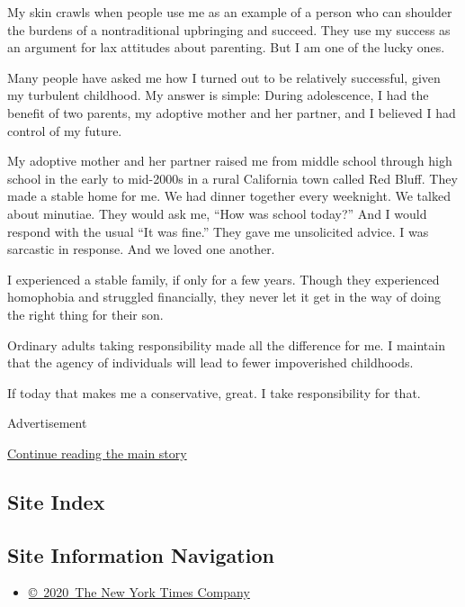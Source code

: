 My skin crawls when people use me as an example of a person who can
shoulder the burdens of a nontraditional upbringing and succeed. They
use my success as an argument for lax attitudes about parenting. But I
am one of the lucky ones.

Many people have asked me how I turned out to be relatively successful,
given my turbulent childhood. My answer is simple: During adolescence, I
had the benefit of two parents, my adoptive mother and her partner, and
I believed I had control of my future.

My adoptive mother and her partner raised me from middle school through
high school in the early to mid-2000s in a rural California town called
Red Bluff. They made a stable home for me. We had dinner together every
weeknight. We talked about minutiae. They would ask me, ``How was school
today?'' And I would respond with the usual ``It was fine.'' They gave
me unsolicited advice. I was sarcastic in response. And we loved one
another.

I experienced a stable family, if only for a few years. Though they
experienced homophobia and struggled financially, they never let it get
in the way of doing the right thing for their son.

Ordinary adults taking responsibility made all the difference for me. I
maintain that the agency of individuals will lead to fewer impoverished
childhoods.

If today that makes me a conservative, great. I take responsibility for
that.

Advertisement

\protect\hyperlink{after-bottom}{Continue reading the main story}

\hypertarget{site-index}{%
\subsection{Site Index}\label{site-index}}

\hypertarget{site-information-navigation}{%
\subsection{Site Information
Navigation}\label{site-information-navigation}}

\begin{itemize}
\tightlist
\item
  \href{https://help.nytimes3xbfgragh.onion/hc/en-us/articles/115014792127-Copyright-notice}{©~2020~The
  New York Times Company}
\end{itemize}

